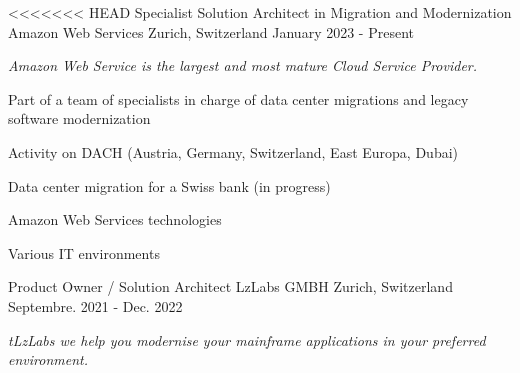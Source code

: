 \clearpage



\begin{cventries}
<<<<<<< HEAD
    \cventry
    {Specialist Solution Architect in Migration and Modernization} %
    {Amazon Web Services} %
    {Zurich, Switzerland} %
    {January 2023 - Present} %
    {
        \experience
            {
                \begin{cvitems} %
                    \item{\emph{Amazon Web Service is the largest and most mature Cloud Service Provider.}}
                    \item {Part of a team of specialists in charge of data center migrations and legacy software modernization }
                    \item {Activity on DACH (Austria, Germany, Switzerland, East Europa, Dubai) }
                    \end{cvitems}
            }
            {
               \begin{cvitems} %
                \item {Data center migration for a Swiss bank (in progress)}
               \end{cvitems}
            }
            {
                \begin{cvitems} %
                    \item{Amazon Web Services technologies}
                    \item{Various IT environments}
                \end{cvitems}
            }            
    }%
    \cventry
    {Product Owner / Solution Architect} %
    {LzLabs GMBH} %
    {Zurich, Switzerland} %
    {Septembre. 2021 - Dec. 2022} %
    {
        \experience
            {
                \begin{cvitems} %
                    \item{\emph{tLzLabs we help you modernise your mainframe applications in your preferred environment.}}

\end{cvitems}}}
\end{cventries}
